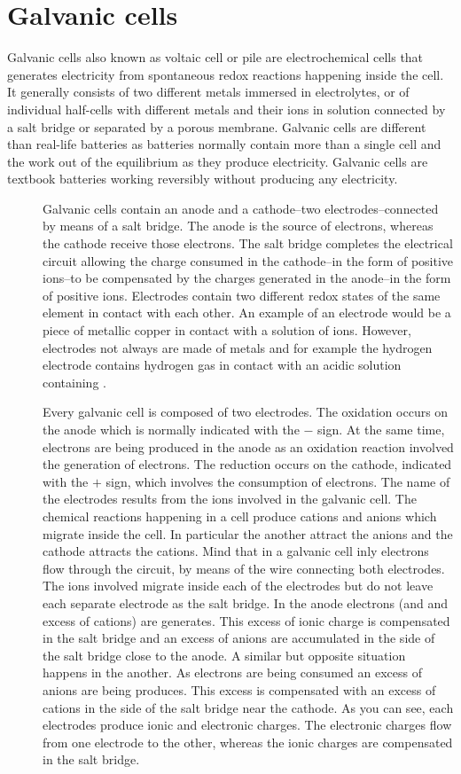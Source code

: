 \documentclass[main.tex]{subfiles}
\begin{document}
\section{Galvanic cells}
Galvanic cells also known as voltaic cell or pile are electrochemical cells that generates electricity from spontaneous redox reactions happening inside the cell. It generally consists of two different metals immersed in electrolytes, or of individual half-cells with different metals and their ions in solution connected by a salt bridge or separated by a porous membrane. Galvanic cells are different than real-life batteries as batteries normally contain more than a single cell and the work out of the equilibrium as they produce electricity. Galvanic cells are textbook batteries working reversibly without producing any electricity.
\sloppy
\begin{description}
\item[] Galvanic cells contain an anode and a cathode--two electrodes--connected by means of a salt bridge. The anode is the source of electrons, whereas the cathode receive those electrons. The salt bridge completes the electrical circuit allowing the charge consumed in the cathode--in the form of  positive ions--to be compensated by the charges generated in the anode--in the form of positive ions. Electrodes contain two different redox states of the same element in contact with each other. An example of an electrode would be a piece of metallic copper in contact with a solution of  ions. However, electrodes not always are made of metals and for example the hydrogen electrode contains hydrogen gas in contact with an acidic solution containing .
\item[]
Every galvanic cell is composed of two electrodes. The oxidation occurs on the anode which is normally indicated with the $-$ sign. At the same time, electrons are being produced in the anode as an oxidation reaction involved the generation of electrons.
The reduction occurs on the cathode, indicated with the $+$ sign, which involves the consumption of electrons.
The name of the electrodes results from the ions involved in the galvanic cell. The chemical reactions happening in a cell produce cations and anions which migrate inside the cell. In particular the another attract the anions and the cathode attracts the cations. Mind that in a galvanic cell inly electrons flow through the circuit, by means of the wire connecting both electrodes. The ions involved migrate inside each of the electrodes but do not leave each separate electrode as the salt bridge. In the anode electrons (and and excess of cations) are generates. This excess of ionic charge is compensated in the salt bridge and an excess of anions are accumulated in the side of the salt bridge close to the anode. A similar but opposite situation happens in the another. As electrons are being consumed an excess of anions are being produces. This excess is compensated with an excess of cations in the side of the salt bridge near the cathode. As you can see, each electrodes produce ionic and electronic charges. The electronic charges flow from one electrode to the other, whereas the ionic charges are compensated in the salt bridge. 

\end{description}
\end{document}
